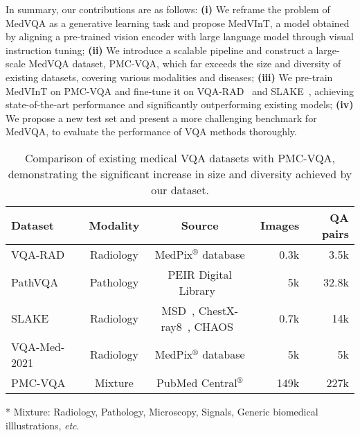 \documentclass{article}
\begin{document}
In summary, our contributions are as follows:
\textbf{(i)} We reframe the problem of MedVQA as a generative learning task and propose MedVInT, a model obtained by aligning a pre-trained vision encoder with large language model through visual instruction tuning; 
\textbf{(ii)} We introduce a scalable pipeline and construct a large-scale MedVQA dataset, PMC-VQA, which far exceeds the size and diversity of existing datasets, covering various modalities and diseases;
\textbf{(iii)} We pre-train MedVInT on PMC-VQA and fine-tune it on 
VQA-RAD~\cite{lau2018dataset} and SLAKE~\cite{liu2021slake},
achieving state-of-the-art performance and significantly outperforming existing models;
\textbf{(iv)} We propose a new test set and present a more challenging benchmark for MedVQA, 
to evaluate the performance of VQA methods thoroughly.


\begin{table*}[t]
\centering
\footnotesize
\renewcommand{\arraystretch}{1.0}
\begin{threeparttable}
\caption{Comparison of existing medical VQA datasets with PMC-VQA, demonstrating the significant increase in size and diversity achieved by our dataset.
}
\label{tab:vqa_dataset}
\vspace{-4pt}
\begin{tabular}{lccrr}
\toprule
Dataset  & Modality & Source &  Images &  QA pairs \\
\midrule
VQA-RAD~\cite{lau2018dataset} &  Radiology &  MedPix$^\circledR$ database & 0.3k & 3.5k\\
PathVQA~\cite{he2020pathvqa} &  Pathology & PEIR Digital Library~\cite{jones2001peir} & 5k & 32.8k  \\
SLAKE~\cite{liu2021slake} & Radiology & MSD~\cite{antonelli2022medical}, ChestX-ray8~\cite{wang2017chestx}, CHAOS~\cite{kavur2021chaos} & 0.7k & 14k  \\
VQA-Med-2021~\cite{ben2021overview} & Radiology &  MedPix$^\circledR$ database & 5k & 5k\\
\midrule
PMC-VQA & Mixture\tnote{*} & PubMed Central$^\circledR$ & 149k & 227k \\
\bottomrule
\end{tabular}
\begin{tablenotes}
\footnotesize
\item[*] Mixture: Radiology, Pathology, Microscopy, Signals, Generic biomedical illlustrations, {\em etc}.
\end{tablenotes}
\end{threeparttable}
\vspace{-0.3cm}
\end{table*}
\end{document}
